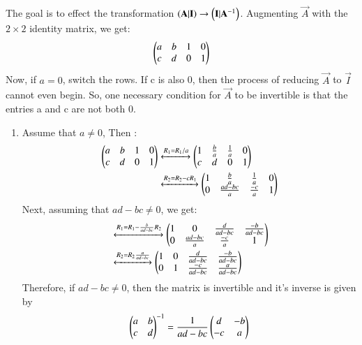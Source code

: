 
The goal is to effect the transformation $\left(\mathbf{A}|\mathbf{I}\right) \rightarrow \left(\mathbf{I}|\mathbf{A}^{-1}\right)$. Augmenting $\vec{A}$ with the $2 \times 2$ identity matrix, we get:
\begin{align}
 \begin{pmatrix}a & b & 1 & 0 \\ c & d & 0 & 1\end{pmatrix} 
\end{align}
Now, if $a = 0$, switch the rows. If c is also 0, then the process of reducing $\vec{A}$ to $\vec{I}$ cannot even begin. So, one necessary condition for $\vec{A}$ to be invertible is that the entries a and c are not both 0. 
\begin{enumerate}
    \item Assume that $a \neq 0$, Then :
\begin{align}
     \label{eq:solutions/1/5/8/anotzero}\begin{pmatrix}a & b & 1 & 0 \\ c & d & 0 & 1\end{pmatrix}
&\xleftrightarrow{R_1 
= R_1/a} \begin{pmatrix}1 & \frac{b}{a} & \frac{1}{a} & 0 \\ c & d & 0 & 1\end{pmatrix}\\
&\xleftrightarrow{R_2 = R_2 - c R_1} \begin{pmatrix}1 & \frac{b}{a} & \frac{1}{a} & 0 \\ 0 & \frac{ad-bc}{a} & \frac{-c}{a} & 1\end{pmatrix}\nonumber
\end{align}
Next, assuming that $ad - bc \neq 0$, we get:
\begin{align}
    &\xleftrightarrow{R_1 = R_1 - \frac{b}{ad-bc} R_2} \begin{pmatrix}1 & 0 & \frac{d}{ad-bc} & \frac{-b}{ad-bc} \\ 0 & \frac{ad-bc}{a} & \frac{-c}{a} & 1\end{pmatrix} \nonumber\\
    &\xleftrightarrow{R_2 = R_2\frac{a}{ad-bc}} \begin{pmatrix}1 & 0 & \frac{d}{ad-bc} & \frac{-b}{ad-bc} \\ 0 & 1 & \frac{-c}{ad-bc} & \frac{a}{ad-bc}\end{pmatrix} \nonumber
\end{align}
Therefore, if $ad - bc \neq 0$, then the matrix is invertible and it's inverse is given by 
\begin{align}
    \begin{pmatrix}a & b \\ c  & d\end{pmatrix}^{-1} = \frac{1}{ad-bc}\begin{pmatrix}d & -b \\ -c  & a\end{pmatrix}
\end{align}


\end{enumerate}
